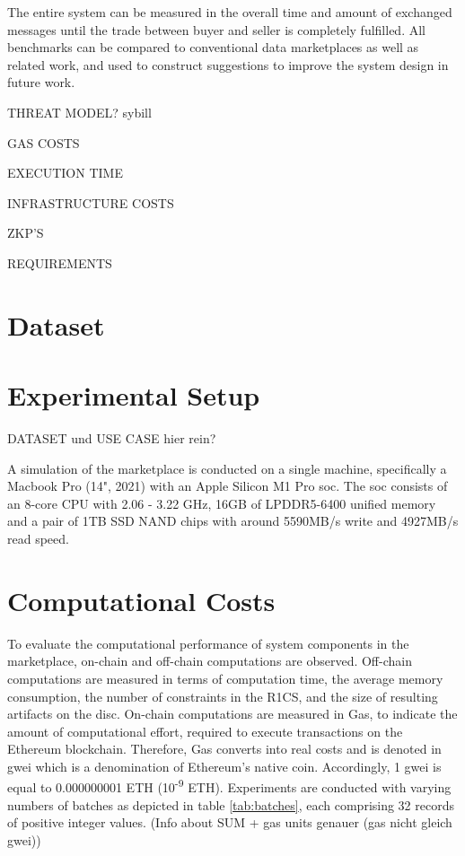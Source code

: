 The entire system can be measured in the overall time and amount of exchanged messages until the trade between buyer and seller is completely fulfilled. All benchmarks can be compared to conventional data marketplaces as well as related work, and used to construct suggestions to improve the system design in future work.

THREAT MODEL?
    sybill
    
    
GAS COSTS

EXECUTION TIME

INFRASTRUCTURE COSTS

ZKP'S

REQUIREMENTS

\section{Dataset}

\newcommand\inch{\mbox{''}} 

\section{Experimental Setup}

DATASET und USE CASE hier rein?

A simulation of the marketplace is conducted on a single machine, specifically a Macbook Pro (14", 2021) with an Apple Silicon M1 Pro \acrfull{soc}. The \acrshort{soc} consists of an 8-core CPU with 2.06 - 3.22 GHz, 16GB of LPDDR5-6400 unified memory and a pair of 1TB SSD NAND chips with around 5590MB/s write and 4927MB/s read speed.

\section{Computational Costs}

To evaluate the computational performance of system components in the marketplace, on-chain and off-chain computations are observed. Off-chain computations are measured in terms of computation time, the average memory consumption, the number of constraints in the R1CS, and the size of resulting artifacts on the disc. On-chain computations are measured in Gas, to indicate the amount of computational effort, required to execute transactions on the Ethereum blockchain. Therefore, Gas converts into real costs and is denoted in gwei which is a denomination of Ethereum's native coin. Accordingly, 1 gwei is equal to 0.000000001 ETH (10\textsuperscript{-9} ETH). Experiments are conducted with varying numbers of batches as depicted in table \ref{tab:batches}, each comprising 32 records of positive integer values. (Info about SUM + gas units genauer (gas nicht gleich gwei))

